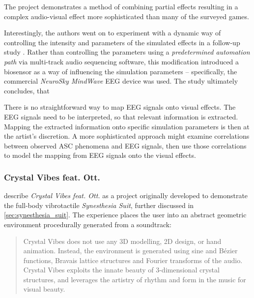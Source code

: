 The project demonstrates a method of combining partial effects resulting in a complex audio-visual effect more sophisticated than many of the surveyed games.

Interestingly, the authors went on to experiment with a dynamic way of controlling the intensity and parameters of the simulated effects in a follow-up study \autocite{weinel2015quake}. Rather than controlling the parameters using a \textit{predetermined automation path} via multi-track audio sequencing software, this modification introduced a biosensor as a way of influencing the simulation parameters -- specifically, the commercial \textit{NeuroSky MindWave} \ac{EEG} device was used. The study ultimately concludes, that 

There is no straightforward way to map \ac{EEG} signals onto visual effects. The \ac{EEG} signals need to be interpreted, so that relevant information is extracted. Mapping the extracted information onto specific simulation parameters is then at the artist's discretion. A more sophisticated approach might examine correlations between observed \ac{ASC} phenomena and \ac{EEG} signals, then use those correlations to model the mapping from \ac{EEG} signals onto the visual effects.

\subsubsection{Crystal Vibes feat. Ott.}\label{sec:crystal_vibes}
\textcite{outram2017crystal} describe \textit{Crystal Vibes feat. Ott.} as a project originally developed to demonstrate the full-body vibrotactile \textit{Synesthesia Suit}, further discussed in \ref{sec:synesthesia_suit}. The experience places the user into an abstract geometric environment procedurally generated from a soundtrack:

\begin{quote}
    Crystal Vibes does not use any 3D modelling, 2D design, or hand animation. Instead, the environment is generated using sine and Bézier functions, Bravais lattice structures and Fourier transforms of the audio. Crystal Vibes exploits the innate beauty of 3-dimensional crystal structures, and leverages the artistry of rhythm and form in the music for visual beauty.
\end{quote}

